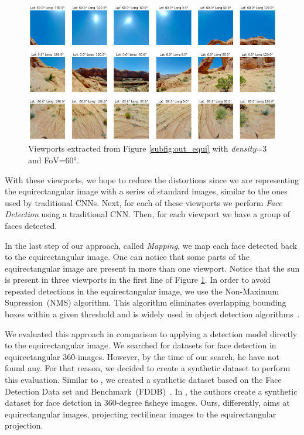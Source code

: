 \begin{figure}[!ht]
    \centering
    \includegraphics[width=1\linewidth]{img/video360/viewports.png}
    \caption{Viewports extracted from Figure \ref{subfig:out_equi} with \emph{density}=3 and FoV=60°.}
    \label{fig:authoring_viewports}
\end{figure}

With these viewports, we hope to reduce the distortions since we are representing the equirectangular image with a series of standard images, similar to the ones used by traditional CNNs. Next, for each of these viewports we perform \emph{Face Detection} using a traditional CNN. Then, for each viewport we have a group of faces detected.

In the last step of our approach, called \emph{Mapping}, we map each face detected back to the equirectangular image. One can notice that some parts of the equirectangular image are present in more than one viewport. Notice that the sun is present in three viewports in the first line of Figure \ref{fig:authoring_viewports}. In order to avoid repeated detections in the equirectangular image, we use the Non-Maximum Supression~(NMS) algorithm. This algorithm eliminates overlapping bounding boxes within a given threshold and is widely used in object detection algorithms~\cite{nms1, nms2, nms3, nms4, nms5}.

We evaluated this approach in comparison to applying a detection model directly to the equirectangular image. We searched for datasets for face detection in equirectangular 360-images. However, by the time of our search, he have not found any. For that reason, we decided to create a synthetic dataset to perform this evaluation. 
Similar to \cite{fu2019fddb}, we created a synthetic dataset based on the Face Detection Data set and Benchmark~(FDDB)~\cite{jain2010fddb}. In \cite{fu2019fddb}, the authors create a synthetic dataset for face detction in 360-degree fisheye images. Ours, differently, aims at equirectangular images, projecting rectilinear images to the equirectangular projection.

